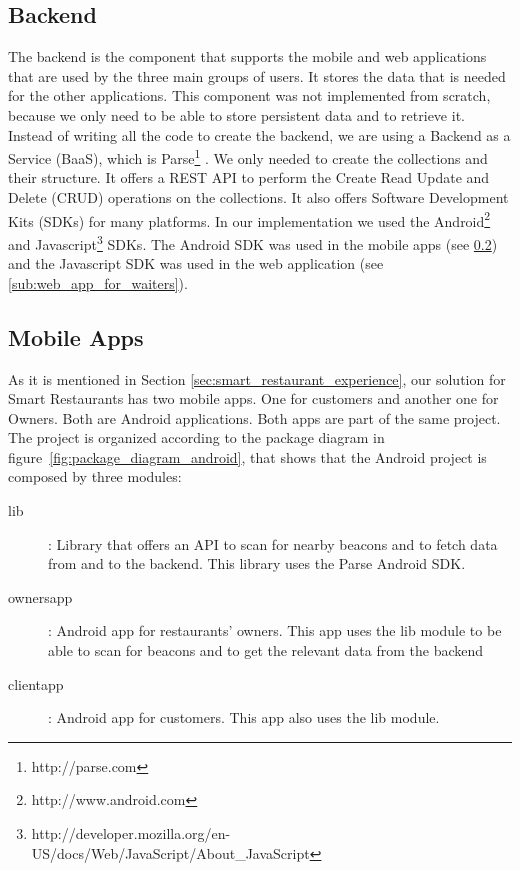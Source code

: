 \subsection{Backend}
\label{sub:backend}
The backend is the component that supports the mobile and web applications
that are used by the three main groups of users. It stores the data that is
needed for the other applications. This component was not implemented from
scratch, because we only need to be able to store persistent data and to
retrieve it. Instead of writing all the code to create the backend, we
are using a Backend as a Service (BaaS), which is Parse\footnote{http://parse.com}
\cite{parse}.
We only needed to create the collections and their structure.
It offers a REST API\cite{restful} to perform the
Create Read Update and Delete (CRUD) operations
on the collections.
It also offers Software Development Kits (SDKs) for many platforms.
In our implementation we used the
Android\footnote{http://www.android.com} and
Javascript\footnote{http://developer.mozilla.org/en-US/docs/Web/JavaScript/About\_JavaScript}
SDKs. The Android SDK was used in the mobile apps (see \ref{sub:mobile_apps})
and the Javascript SDK was used in the web application
(see \ref{sub:web_app_for_waiters}).

\subsection{Mobile Apps}
\label{sub:mobile_apps}
As it is mentioned in Section \ref{sec:smart_restaurant_experience}, our
solution for Smart Restaurants has two mobile apps. One for customers and
another one for Owners. Both are Android applications. Both apps are
part of the same project. The project is organized according to the
package diagram in figure~\ref{fig:package_diagram_android}, that shows
that the Android project is composed by three modules:
\begin{description}
  \item[lib]: Library that offers an API to scan for nearby beacons and
  to fetch data from and to the backend. This library uses the Parse Android
  SDK.
  \item[ownersapp]: Android app for restaurants' owners. This app uses
  the lib module to be able to scan for beacons and to get the relevant
  data from the backend
  \item[clientapp]: Android app for customers. This app also uses the lib
  module.
\end{description}

